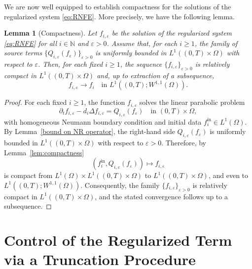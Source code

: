 \documentclass[a4paper,12pt,reqno]{amsart}
\theoremstyle{plain}
\newtheorem{lem}[thm]{Lemma}
\numberwithin{equation}{section}
\begin{document}
	We are now well equipped to establish compactness for the solutions of the
	regularized system \eqref{eq:RNFE}. More precisely, we have the following lemma.
	\begin{lem}[Compactness]
		\label{lem:compactness of sequence}
		Let $f_{i,\varepsilon}$ be the solution of the regularized system \eqref{eq:RNFE} for all $i\in\mathbb{N}$ and $\varepsilon>0$. Assume that, for each $i\ge1$, the family of source terms
		$\{Q_{i,\varepsilon}(f_{\varepsilon})\}_{\varepsilon>0}$ is uniformly bounded in
		$L^1((0,T)\times\Omega)$ with respect to $\varepsilon$.
		Then, for each fixed $i\ge1$, the sequence
		$\{f_{i,\varepsilon}\}_{\varepsilon>0}$ is relatively compact in
		$L^1((0,T)\times\Omega)$ and, up to extraction of a subsequence,
		\[
		f_{i,\varepsilon} \to f_i
		\quad \text{in } L^1((0,T); W^{1,1}(\Omega)).
		\]
	\end{lem}
	
	\begin{proof}
		For each fixed $i\ge1$, the function $f_{i,\varepsilon}$ solves the linear
		parabolic problem
		\[
		\partial_t f_{i,\varepsilon} - d_i \Delta f_{i,\varepsilon}
		= Q_{i,\varepsilon}(f_{\varepsilon})
		\quad \text{in } (0,T)\times\Omega,
		\]
		with homogeneous Neumann boundary condition and initial data $f_i^{\mathrm{in}}\in L^1(\Omega)$.
		By Lemma~\ref{bound on NR operator}, the right-hand side $Q_{i,\varepsilon}(f_{\varepsilon})$ is uniformly
		bounded in $L^1((0,T)\times\Omega)$ with respect to $\varepsilon>0$.
		Therefore, by Lemma~\ref{lem:compactness}
		\[
		(f_i^{\mathrm{in}}, Q_{i,\varepsilon}(f_{\varepsilon})) \mapsto f_{i,\varepsilon}
		\]
		is compact from $L^1(\Omega)\times L^1((0,T)\times\Omega)$ to
		$L^1((0,T)\times\Omega)$, and even to
		$L^1((0,T); W^{1,1}(\Omega))$.
		Consequently, the family $\{f_{i,\varepsilon}\}_{\varepsilon>0}$ is
		relatively compact in $L^1((0,T)\times\Omega)$, and the stated convergence
		follows up to a subsequence.
	\end{proof}
	
	\section{\textbf{Control of the Regularized Term via a Truncation Procedure}} \label{TPCRT}
	
\end{document}
